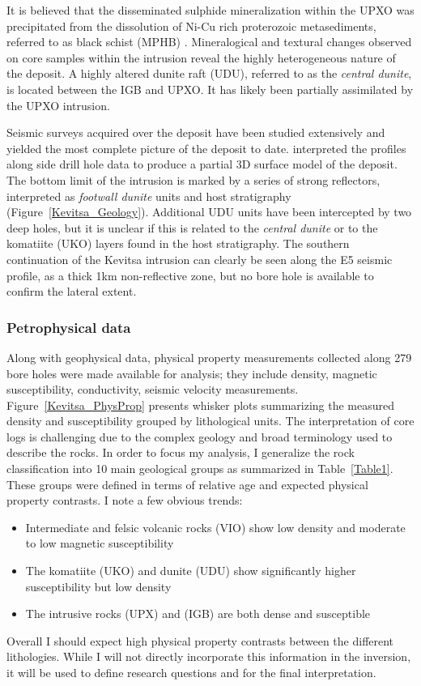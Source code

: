 It is believed that the disseminated sulphide mineralization within the UPXO was precipitated from the dissolution of Ni-Cu rich proterozoic metasediments, referred to as black schist (MPHB) \cite[]{Mutanen1997}.
Mineralogical and textural changes observed on core samples within the intrusion reveal the highly heterogeneous nature of the deposit. A highly altered dunite raft (UDU), referred to as the \emph{central dunite}, is located between the IGB and UPXO. It has likely been partially assimilated by the UPXO intrusion.

Seismic surveys acquired over the deposit have been studied extensively and yielded the most complete picture of the deposit to date. \cite{Koivisto2015} interpreted the profiles along side drill hole data to produce a partial 3D surface model of the deposit.
The bottom limit of the intrusion is marked by a series of strong reflectors, interpreted as \emph{footwall dunite} units and host stratigraphy (Figure~\ref{Kevitsa_Geology}).
Additional UDU units have been intercepted by two deep holes, but it is unclear if this is related to the \emph{central dunite} or to the komatiite (UKO) layers found in the host stratigraphy.
The southern continuation of the Kevitsa intrusion can clearly be seen along the E5 seismic profile, as a thick 1km non-reflective zone, but no bore hole is available to confirm the lateral extent.

\subsubsection{Petrophysical data}
Along with geophysical data, physical property measurements collected along 279 bore holes were made available for analysis; they include density, magnetic susceptibility, conductivity, seismic velocity measurements.
Figure~\ref{Kevitsa_PhysProp} presents whisker plots summarizing the measured density and susceptibility grouped by lithological units. The interpretation of core logs is challenging due to the complex geology and broad terminology used to describe the rocks. In order to focus my analysis, I generalize the rock classification into 10 main geological groups as summarized in Table~\ref{Table1}. These groups were defined in terms of relative age and expected physical property contrasts.
I note a few obvious trends:
\begin{itemize}
\item Intermediate and felsic volcanic rocks (VIO) show low density and moderate to low magnetic susceptibility
\item The komatiite (UKO) and dunite (UDU) show significantly higher susceptibility but low density
\item The intrusive rocks (UPX) and (IGB) are both dense and susceptible
\end{itemize}
Overall I should expect high physical property contrasts between the different lithologies.
While I will not directly incorporate this information in the inversion, it will be used to define research questions and for the final interpretation.

